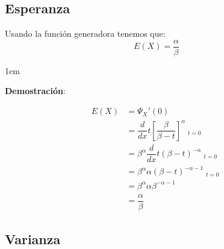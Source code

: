 \documentclass[12pt, fleqn]{report}                             %
\newenvironment{SmallIndentation}[1][0.75em]                    %
        {\begin{adjustwidth}{#1}{}\begin{footnotesize}}             %
        {\end{footnotesize}\end{adjustwidth}}                       %
\theoremstyle{break}                                            %
\newcommand{\Brackets}[1]{\left[ #1 \right]}                    %
\newcommand{\Wrap}[1]{\left( #1 \right)}                        %
\newcommand \MiniDerivate[1][x] {\dfrac{d}{d #1}}               %
\DeclareMathOperator \Evaluate  {\Big|}                         %
\begin{document}
            \clearpage
            \subsection{Esperanza}

                Usando la función generadora tenemos que:
                \begin{equation*}
                    E(X) = \dfrac{\alpha}{\beta}
                \end{equation*}

                \begin{SmallIndentation}[1em]
                    \textbf{Demostración}:
                    
                    \begin{align*}
                        E(X)
                            &= \Psi_X'(0)                                                                           \\
                            &= \MiniDerivate{t} \Brackets{\dfrac{\beta}{\beta - t}}^\alpha \Evaluate_{t = 0}        \\
                            &= \beta^\alpha \MiniDerivate{t} \Wrap{\beta - t}^{-\alpha} \Evaluate_{t = 0}           \\
                            &= \beta^\alpha \alpha(\beta - t)^{-\alpha - 1} \Evaluate_{t = 0}                       \\
                            &= \beta^\alpha \alpha \beta^{-\alpha - 1}                                              \\
                            &= \dfrac{\alpha}{\beta}
                    \end{align*}
                
                \end{SmallIndentation}



            \subsection{Varianza}
\end{document}
